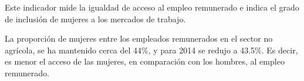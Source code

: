 Este indicador mide la igualdad de acceso al empleo remunerado e indica el grado de inclusión de  mujeres a los mercados de trabajo. 

La proporción de mujeres entre los empleados remunerados en el sector no agrícola, se ha mantenido cerca del 44\%, y para 2014 se redujo  a 43.5\%. Es decir, es menor el acceso de las mujeres, en comparación con los hombres, al empleo remunerado.
